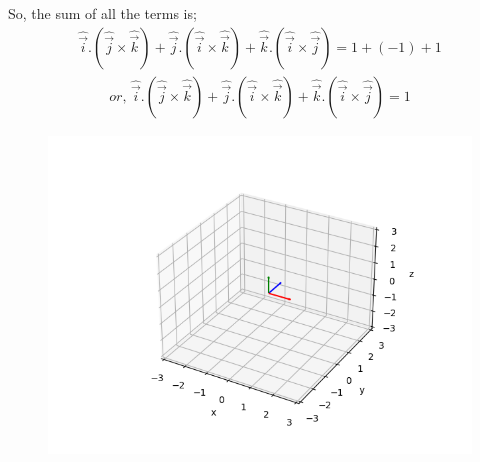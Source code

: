 \documentclass{beamer}
\providecommand{\brak}[1]{\ensuremath{\left(#1\right)}}
\theoremstyle{remark}
\numberwithin{equation}{section}
\begin{document}
\begin{frame}
So, the sum of all the terms is;
\begin{align}
\hat{\Vec{i}}.\brak{\hat{\Vec{j}} \times \hat{\Vec{k}}} + \hat{\Vec{j}}.\brak{\hat{\Vec{i}} \times \hat{\Vec{k}}} + \hat{\Vec{k}}.\brak{\hat{\Vec{i}} \times \hat{\Vec{j}}} = 1 + (-1) + 1
\end{align}
\begin{align}
or, \, \hat{\Vec{i}}.\brak{\hat{\Vec{j}} \times \hat{\Vec{k}}} + \hat{\Vec{j}}.\brak{\hat{\Vec{i}} \times \hat{\Vec{k}}} + \hat{\Vec{k}}.\brak{\hat{\Vec{i}} \times \hat{\Vec{j}}} = 1
\end{align}
\end{frame}

\begin{frame}
\begin{figure}[H]
\centering
\includegraphics[width=0.6\columnwidth]{figs/img.png}
\caption*{}
\end{figure}
\end{frame}
\end{document}

